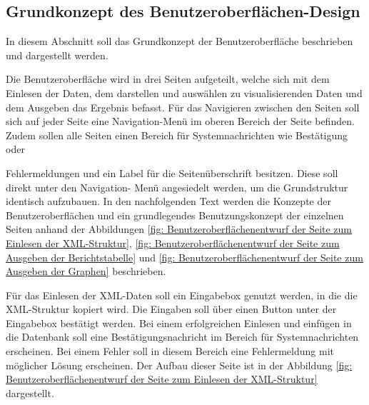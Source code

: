 \subsection{Grundkonzept des Benutzeroberflächen-Design}
\label{subsec:grundkonzept-des-benutzeroberflachen-design}

In diesem Abschnitt soll das Grundkonzept der Benutzeroberfläche beschrieben und dargestellt werden.

Die Benutzeroberfläche wird in drei Seiten aufgeteilt, welche sich mit dem Einlesen der Daten, dem
darstellen und auswählen zu visualisierenden Daten und dem Ausgeben das Ergebnis befasst.
Für das Navigieren zwischen den Seiten soll sich auf jeder Seite eine Navigation-Menü im oberen Bereich
der Seite befinden. Zudem sollen alle Seiten einen Bereich für Systemnachrichten wie Bestätigung oder

Fehlermeldungen und ein Label für die Seitenüberschrift besitzen. Diese soll direkt unter den Navigation-
Menü angesiedelt werden, um die Grundstruktur identisch aufzubauen. In den nachfolgenden Text werden
die Konzepte der Benutzeroberflächen und ein grundlegendes Benutzungskonzept der einzelnen Seiten
anhand der Abbildungen \ref{fig: Benutzeroberflächenentwurf der Seite zum Einlesen der XML-Struktur},
\ref{fig: Benutzeroberflächenentwurf der Seite zum Ausgeben der Berichtstabelle} und \ref{fig: Benutzeroberflächenentwurf der Seite zum Ausgeben der Graphen} beschrieben.

Für das Einlesen der XML-Daten soll ein Eingabebox genutzt werden, in die die XML-Struktur kopiert wird.
Die Eingaben soll über einen Button unter der Eingabebox bestätigt werden. Bei einem erfolgreichen
Einlesen und einfügen in die Datenbank soll eine Bestätigungsnachricht im Bereich für
Systemnachrichten erscheinen. Bei einem Fehler soll in diesem Bereich eine Fehlermeldung mit
möglicher Lösung erscheinen. Der Aufbau dieser Seite ist in der Abbildung \ref{fig: Benutzeroberflächenentwurf der Seite zum Einlesen der XML-Struktur} dargestellt.

